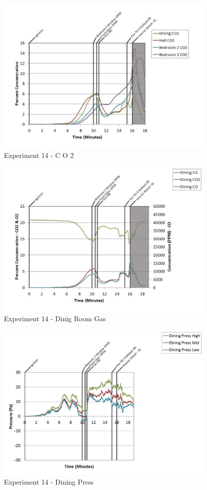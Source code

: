 \documentclass{article}
\begin{document}
\begin{appendices}
	\clearpage

	\begin{figure}[h!]
		\centering
		\includegraphics[height=3.05in]{0_Images/Results_Charts/Exp_14_Charts/CO2.pdf}
		\caption{Experiment 14 - C O 2}
	\end{figure}
 

	\begin{figure}[h!]
		\centering
		\includegraphics[height=3.05in]{0_Images/Results_Charts/Exp_14_Charts/DinigRoomGas.pdf}
		\caption{Experiment 14 - Dinig Room Gas}
	\end{figure}
 
	\clearpage

	\begin{figure}[h!]
		\centering
		\includegraphics[height=3.05in]{0_Images/Results_Charts/Exp_14_Charts/DiningPress.pdf}
		\caption{Experiment 14 - Dining Press}
	\end{figure}
 


\end{appendices}
\end{document}
